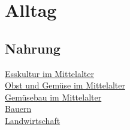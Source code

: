 \chapter{Alltag}

\section{Nahrung}
\href{https://de.wikipedia.org/wiki/Esskultur_im_Mittelalter}{Esskultur im Mittelalter}\\
\href{https://www.grin.com/document/171690}{Obst und Gemüse im Mittelalter}\\
\href{http://www.hortipendium.de/Gem\%C3\%BCsebau_im_Mittelalter}{Gemüsebau im Mittelalter}\\
\href{https://www.leben-im-mittelalter.net/alltag-im-mittelalter/arbeit-und-berufe/bauern.html}{Bauern}\\
\href{https://www.leben-im-mittelalter.net/kultur-im-mittelalter/wirtschaft/landwirtschaft.html}{Landwirtschaft}\\
